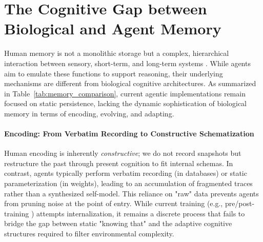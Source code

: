 \documentclass[manuscript,screen]{acmart}
\begin{document}



\section{The Cognitive Gap between Biological and Agent Memory}
\label{sec:human_vs_agent_memory}

Human memory is not a monolithic storage but a complex, hierarchical interaction between sensory, short-term, and long-term systems \citep{baddeley1988cognitive}. While agents aim to emulate these functions to support reasoning, their underlying mechanisms are different from biological cognitive architectures. As summarized in Table~\ref{tab:memory_comparison}, current agentic implementations remain focused on static persistence, lacking the dynamic sophistication of biological memory in terms of encoding, evolving, and adapting.

\paragraph{Encoding: From Verbatim Recording to Constructive Schematization} Human encoding is inherently \textit{constructive}; we do not record snapshots but restructure the past through present cognition to fit internal schemas. In contrast, agents typically perform verbatim recording (in databases) or static parameterization (in weights), leading to an accumulation of fragmented traces rather than a synthesized self-model. This reliance on "raw" data prevents agents from pruning noise at the point of entry. While current training (e.g., pre/post-training \citep{liu2024deepseek}) attempts internalization, it remains a discrete process that fails to bridge the gap between static "knowing that" and the adaptive cognitive structures required to filter environmental complexity.
\end{document}
